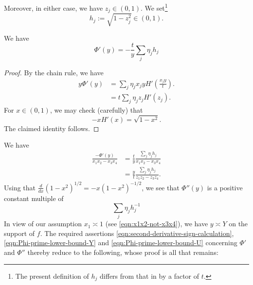 \documentclass[reqno]{amsart} 
\begin{document}
Moreover, in either case, we have $z_j \in (0,1)$.  We set\footnote{The present definition of $h_j$ differs from that in \cite{ki20234} by a factor of $t$.}
\begin{equation*}
  h_j := \sqrt{1 - z_j ^2 } \in (0,1).
\end{equation*}
\begin{lemma}\label{lemma:formula-derivative-Phi}
  We have
  \begin{equation*}
    \Phi ' (y) = - \frac{t}{y} \sum _j \eta _j h_j
  \end{equation*}
\end{lemma}
\begin{proof}
  By the chain rule, we have
  \begin{align*}
    y \Phi '(y) &= \sum _j \eta _j x _j y H' \left( \frac{x _j y}{t} \right).
    \\
                &= t \sum _j \eta _j z_j H' \left( z_j \right).
  \end{align*}
  For $x \in (0,1)$, we may check (carefully) that
  \begin{equation*}
    - x H ' (x) = \sqrt{1 - x ^{2}}.
  \end{equation*}
  The claimed identity follows.
\end{proof}
We have
\begin{align*}
  \frac{-\Phi '(y)}{x_1 x_2 - x_3 x_4} &= \frac{t }{y} \frac{\sum _j \eta _j h _j }{x_1 x_2 - x_3 x_4} \\
                                       &= \frac{y}{t} \frac{\sum _j \eta _j h _j }{ z _1 z _2 - z _3 z _4 }.
\end{align*}
Using that $\frac{d}{d x } (1 - x ^2 )^{1/2} = - x (1 - x^2)^{-1/2}$, we see that $\Phi ''(y)$ is a positive constant multiple of
\begin{equation*}
  \sum  _j \eta _j h_j^{-1}
\end{equation*}
In view of our assumption $x_1 \asymp 1$ (see \eqref{eqn:x1x2-not-x3x4}), we have $y \asymp Y$ on the support of $f$.  The required assertions \eqref{eqn:second-derivative-sign-calculation}, \eqref{eqn:Phi-prime-lower-bound-Y} and \eqref{eqn:Phi-prime-lower-bound-U} concerning $\Phi '$ and $\Phi ''$ thereby reduce to the following, whose proof is all that remains:
\end{document}
